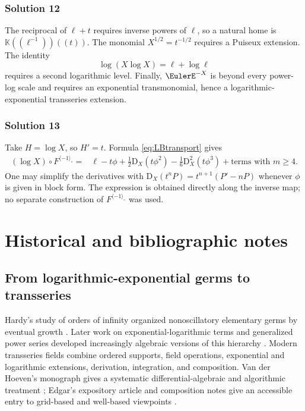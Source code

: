 \documentclass[11pt,oneside,openany]{book}
\newcommand{\K}{\mathbb{K}}
\newcommand{\compose}{\mathbin{\circ}}
\newcommand{\rev}{^{\langle-1\rangle_{\circ}}}
\newcommand{\D}{\mathrm{D}}
\begin{document}
\subsection*{Solution 12}
The reciprocal of \(\ell+t\) requires inverse powers of \(\ell\), so a
natural home is \(\K((\ell^{-1}))((t))\).  The monomial
\(X^{1/2}=t^{-1/2}\) requires a Puiseux extension.  The identity
\[
 \log(X\log X)=\ell+\log\ell
\]
requires a second logarithmic level.  Finally, \(\EulerE^{-X}\) is beyond every
power-log scale and requires an exponential transmonomial, hence a
logarithmic-exponential transseries extension.

\subsection*{Solution 13}
Take \(H=\log X\), so \(H'=t\).  Formula \cref{eq:LBtransport} gives
\begin{align*}
 (\log X)\compose F\rev
 ={}&\ell-t\phi
 +\frac12\D_X(t\phi^2)
 -\frac16\D_X^2(t\phi^3)
 +\text{terms with }m\geq4.
\end{align*}
One may simplify the derivatives with
\(\D_X(t^nP)=t^{n+1}(P'-nP)\) whenever \(\phi\) is given in block form.
The expression is obtained directly along the inverse map; no separate
construction of \(F\rev\) was used.


\chapter{Historical and bibliographic notes}
\label{app:history}

\section{From logarithmic-exponential germs to transseries}
Hardy's study of orders of infinity organized nonoscillatory elementary germs
by eventual growth \cite{Hardy1910}.  Later work on exponential-logarithmic
terms and generalized power series developed increasingly algebraic versions
of this hierarchy \cite{DahnGoering1987,vanDenDriesMacintyreMarker1997,
vanDenDriesMacintyreMarker2001}.  Modern transseries fields combine ordered
supports, field operations, exponential and logarithmic extensions,
derivation, integration, and composition.  Van der Hoeven's monograph gives a
systematic differential-algebraic and algorithmic treatment
\cite{vanDerHoeven2006}; Edgar's expository article and composition notes give
an accessible entry to grid-based and well-based viewpoints
\cite{EdgarBeginners,EdgarComposition}.
\end{document}
